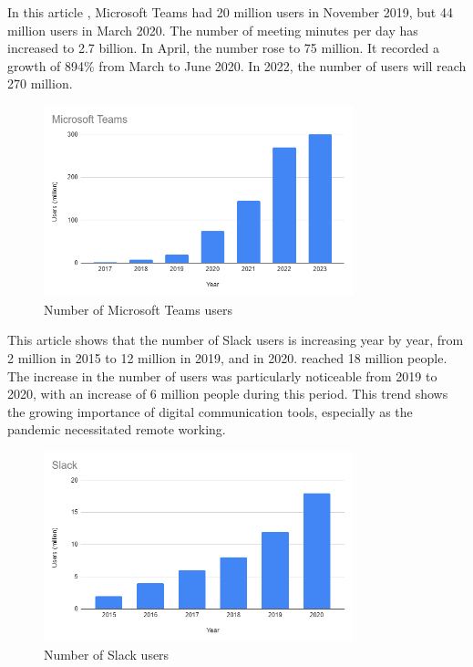 \documentclass[12pt]{article}
\begin{document}
In this article \cite{ref6},
Microsoft
Teams had 20 million users in November 2019, but 44 million users in March
2020. The number of meeting minutes per day has increased to 2.7 billion. In
April, the number rose to 75 million. It recorded a growth of
894\% from March to June 2020. In 2022, the number of users will reach 270
million.

\begin{figure}[H]
    \centering
    \includegraphics[width=0.8\textwidth]{teams.png}
    \caption{Number of Microsoft Teams users}
    \label{fig:my_label}
\end{figure}

This article \cite{ref7} shows that
the number of Slack users is increasing year by year, from 2 million in 2015 to
12 million in 2019, and in 2020. reached 18 million people. The increase in the
number of users was particularly noticeable from 2019 to 2020, with an increase
of 6 million people during this period. This trend shows the growing importance
of digital communication tools, especially as the pandemic necessitated remote
working.

\begin{figure}[H]
    \centering
    \includegraphics[width=0.8\textwidth]{slack.png}
    \caption{Number of Slack users}
    \label{fig:my_label}
\end{figure}
\end{document}
